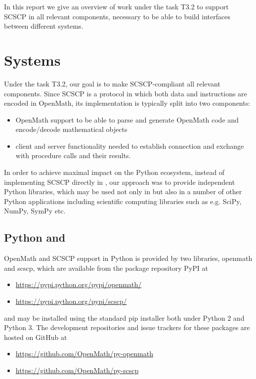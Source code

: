 \documentclass{deliverablereport}
\begin{document}
In this report we give an overview of work under the task T3.2 
to support SCSCP in all relevant components, necessary to be able
to build interfaces between different systems. 


\section{Systems}\label{systems}

Under the task T3.2, our goal is to make SCSCP-compliant all
relevant components. Since SCSCP is a protocol in which 
both data and instructions are encoded in OpenMath, its
implementation is typically split into two components: 
\begin{itemize}
\item OpenMath support to be able to parse and 
generate OpenMath code and encode/decode mathematical objects
\item client and server functionality needed to establish connection
and exchange with procedure calls and their results.
\end{itemize}

In order to achieve maximal impact on the Python ecosystem, 
instead of implementing SCSCP directly in \Sage, our approach
was to provide independent Python libraries, which may be used not
only in \Sage but also in a number of other Python applications
including scientific computing libraries such as e.g. 
SciPy, NumPy, SymPy etc.



\subsection{Python and \Sage}

OpenMath and SCSCP support in Python is provided by two libraries,
{\sf openmath} and {\sf scscp}, which are available from the package
repository PyPI at
\begin{itemize}
\item \url{https://pypi.python.org/pypi/openmath/}
\item \url{https://pypi.python.org/pypi/scscp/}
\end{itemize}
and may be installed using 
the standard {\sf pip} installer both under Python 2 and Python 3. The
development repositories and issue trackers for these packages are
hosted on GitHub at 
\begin{itemize}
\item \url{https://github.com/OpenMath/py-openmath}
\item \url{https://github.com/OpenMath/py-scscp}
\end{itemize}
\end{document}
